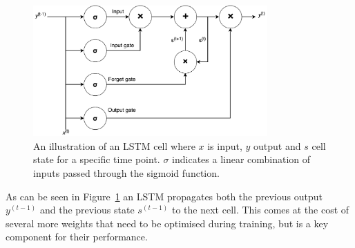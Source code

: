 \begin{figure}[H]
  \centering
  \includegraphics[width=0.8\textwidth]{graphics/lstm-cell}
  \caption{An illustration of an LSTM cell where $x$ is input, $y$ output and $s$ cell state for a specific time point. $\sigma$ indicates a linear combination of inputs passed through the sigmoid function. }\label{fig:lstm-cell}
\end{figure}
As can be seen in Figure~\ref{fig:lstm-cell} an LSTM propagates both the previous output $y^{(t-1)}$ and the previous state $s^{(t-1)}$ to the next cell. This comes at the cost of several more weights that need to be optimised during training, but is a key component for their performance.